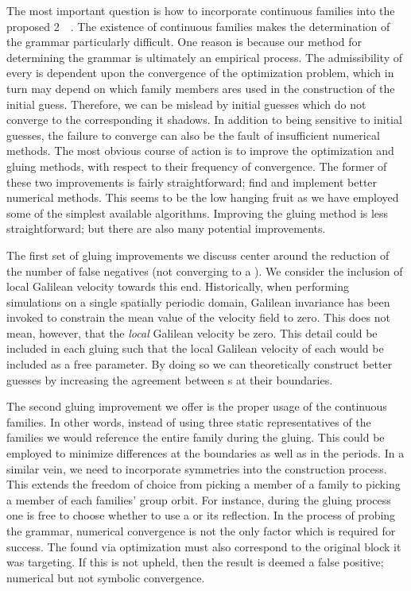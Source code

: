 The most important question is how to incorporate
continuous families into the proposed  2\dmn\ \spt\ {\symbolic}.
The existence of continuous families makes the determination of the {\symbolic} grammar
particularly difficult. One reason is because our method for
determining the grammar is ultimately an empirical process.
The admissibility of every {\po} is
dependent upon the convergence of the optimization problem, which in turn may depend on
which {\fpo} family members ares used in the construction of the initial guess.
Therefore, we can be mislead by initial guesses which do not converge to the corresponding
{\po} it shadows. In addition to being sensitive to initial guesses, the
failure to converge can also be the fault of insufficient numerical methods.
The most obvious course of action is to improve the
optimization and gluing methods, with respect to their frequency of convergence.
The former of these two improvements is fairly
straightforward; find and implement better numerical methods. This seems
to be the low hanging fruit as we have employed some of the simplest available
algorithms. Improving the gluing method is less straightforward; but there are
also many potential improvements.

The first set of gluing improvements we discuss center around the reduction of
the number of false negatives (not converging to a {\po}). We consider
the inclusion of local Galilean velocity towards this end. Historically,
when performing simulations on a single spatially periodic domain,
Galilean invariance has been invoked to constrain the mean value of
the velocity field to zero. This does not mean, however, that the \emph{local}
Galilean velocity be zero. This detail could be included in each gluing such that the
local Galilean velocity of each {\fpo} would be included as a free parameter. By
doing so we can theoretically construct better guesses by increasing the
agreement between {\fpo}s at their boundaries.

The second gluing improvement we offer is the proper usage of the {\fpo} continuous families.
In other words, instead of using three static representatives of the families
we would reference the entire family during the gluing. This could be employed to
minimize differences at the
boundaries as well as in the periods.
In a similar vein, we need to incorporate symmetries into the construction process.
This extends the freedom of choice from picking a member of a family to
picking a member of each families' group orbit. For instance, during the gluing
process one is free to choose whether to use a {\fpo} or its reflection.
In the process of probing the {\symbolic} grammar, numerical convergence is not
the only factor which is required for success. The {\po} found via optimization
must also correspond to the original {block} it was targeting. If this is not
upheld, then the result is deemed a false positive; numerical but not symbolic
convergence.


